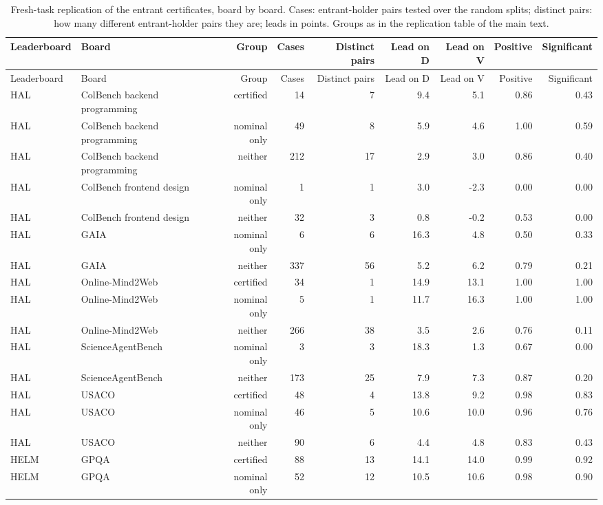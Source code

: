 \begin{longtable}{llrrrrrrr}
\caption{Fresh-task replication of the entrant certificates, board by board. Cases: entrant-holder pairs tested over the random splits; distinct pairs: how many different entrant-holder pairs they are; leads in points. Groups as in the replication table of the main text.}\label{tab:supp-replication}\\
\toprule
Leaderboard & Board & Group & Cases & Distinct pairs & Lead on D & Lead on V & Positive & Significant \\
\midrule
\endfirsthead
\toprule
Leaderboard & Board & Group & Cases & Distinct pairs & Lead on D & Lead on V & Positive & Significant \\
\midrule
\endhead
\bottomrule
\endfoot
HAL & ColBench backend programming & certified & 14 & 7 & 9.4 & 5.1 & 0.86 & 0.43 \\
HAL & ColBench backend programming & nominal only & 49 & 8 & 5.9 & 4.6 & 1.00 & 0.59 \\
HAL & ColBench backend programming & neither & 212 & 17 & 2.9 & 3.0 & 0.86 & 0.40 \\
HAL & ColBench frontend design & nominal only & 1 & 1 & 3.0 & -2.3 & 0.00 & 0.00 \\
HAL & ColBench frontend design & neither & 32 & 3 & 0.8 & -0.2 & 0.53 & 0.00 \\
HAL & GAIA & nominal only & 6 & 6 & 16.3 & 4.8 & 0.50 & 0.33 \\
HAL & GAIA & neither & 337 & 56 & 5.2 & 6.2 & 0.79 & 0.21 \\
HAL & Online-Mind2Web & certified & 34 & 1 & 14.9 & 13.1 & 1.00 & 1.00 \\
HAL & Online-Mind2Web & nominal only & 5 & 1 & 11.7 & 16.3 & 1.00 & 1.00 \\
HAL & Online-Mind2Web & neither & 266 & 38 & 3.5 & 2.6 & 0.76 & 0.11 \\
HAL & ScienceAgentBench & nominal only & 3 & 3 & 18.3 & 1.3 & 0.67 & 0.00 \\
HAL & ScienceAgentBench & neither & 173 & 25 & 7.9 & 7.3 & 0.87 & 0.20 \\
HAL & USACO & certified & 48 & 4 & 13.8 & 9.2 & 0.98 & 0.83 \\
HAL & USACO & nominal only & 46 & 5 & 10.6 & 10.0 & 0.96 & 0.76 \\
HAL & USACO & neither & 90 & 6 & 4.4 & 4.8 & 0.83 & 0.43 \\
HELM & GPQA & certified & 88 & 13 & 14.1 & 14.0 & 0.99 & 0.92 \\
HELM & GPQA & nominal only & 52 & 12 & 10.5 & 10.6 & 0.98 & 0.90 \\

\end{longtable}
